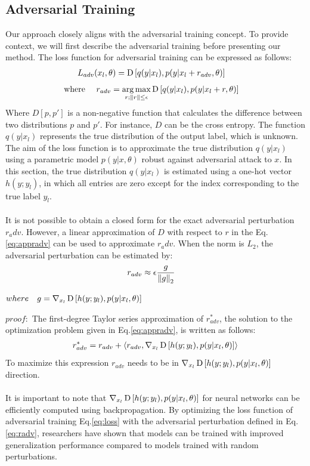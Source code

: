 \documentclass[paper=a4, fontsize=11pt]{scrartcl}
\numberwithin{equation}{section}		%
\numberwithin{figure}{section}			%
\numberwithin{table}{section}				%
\begin{document}
\subsection{Adversarial Training \cite{Intriguing
properties of neural networks}}
Our approach closely aligns with the adversarial training concept. To provide context, we will first describe the adversarial training before presenting our method. The loss function for adversarial training can be expressed as follows:
\begin{align}
\label{eq:loss}L_{adv}(x_l, \theta) &= \operatorname*{D} \left[q(y | x_l), p(y | x_l + r_{adv}, \theta)\right]
\end{align}
\begin{align}
\label{eq:appradv} \text{where } \quad r_{adv} &= \operatorname*{arg\,max}_{r; \left\lVert r\right\rVert \le \epsilon} \operatorname*{D} \left[q(y | x_l), p(y | x_l + r, \theta)\right] 
\end{align}
Where $D[p, p']$ is a non-negative function that calculates the difference between two distributions $p$ and $p'$. For instance, $D$ can be the cross entropy. The function $q(y|x_l)$ represents the true distribution of the output label, which is unknown. The aim of the loss function is to approximate the true distribution $q(y|x_l)$ using a parametric model $p(y|x, \theta)$ robust against adversarial attack to $x$. In this section, the true distribution $q(y|x_l)$ is estimated using a one-hot vector $h(y;y_l)$, in which all entries are zero except for the index corresponding to the true label $y_l$. 
\\
\\
It is not possible to obtain a closed form for the exact adversarial perturbation $r_adv$. However, a linear approximation of $D$ with respect to $r$ in the Eq.\eqref{eq:appradv} can be used to approximate $r_adv$. When the norm is $L_2$, the adversarial perturbation can be estimated by:
\\
\begin{align}
\label{eq:radv}r_{adv} &\approx \epsilon \frac{g}{\left\lVert g\right\rVert_2}
\end{align}
\begin{center}
$where \quad g = \nabla_{x_l} \operatorname*{D} \left[h(y ; y_l), p(y | x_l, \theta)\right]$\\
\end{center}
$proof:$ The first-degree Taylor series approximation of $r_{adv}^*$, the solution to the optimization problem given in Eq.\eqref{eq:appradv}, is written as follows:
\begin{align}
r_{adv}^* = r_{adv} + \langle r_{adv},\nabla_{x_l} \operatorname*{D} \left[h(y ; y_l), p(y | x_l, \theta)\right]\rangle
\end{align}
To maximize this expression $r_{adv}$ needs to be in $\nabla_{x_l} \operatorname*{D} \left[h(y ; y_l), p(y | x_l, \theta)\right]$ direction.
\\
\\
It is important to note that $\nabla_{x_l} \operatorname*{D} \left[h(y ; y_l), p(y | x_l, \theta)\right]$ for neural networks can be efficiently computed using backpropagation. By optimizing the loss function of adversarial training Eq.\eqref{eq:loss} with the adversarial perturbation defined in Eq.\eqref{eq:radv}, researchers have shown that models can be trained with improved generalization performance compared to models trained with random perturbations.
\end{document}
